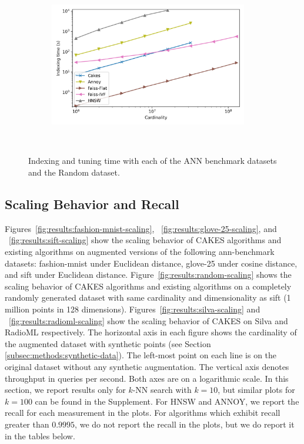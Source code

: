 \begin{figure}
\begin{subfigure}[b]{0.47\textwidth}
    \label{fig:results:sift-indexing}
    \end{subfigure}%
    \begin{subfigure}[b]{0.47\textwidth}
    \includegraphics[width=0.95\textwidth]{plots/random-indexing.png}\\
    \label{fig:results:random-indexing}
    \end{subfigure}%
    \\
    \vspace{1em}
    \caption{Indexing and tuning time with each of the ANN benchmark datasets and the Random dataset.}
    \label{fig:results:indexing}
\end{figure}


\subsection{Scaling Behavior and Recall}
\label{subsec:scaling-behavior-results}

Figures~\ref{fig:results:fashion-mnist-scaling}, ~\ref{fig:results:glove-25-scaling}, and ~\ref{fig:results:sift-scaling} show the scaling behavior of CAKES algorithms and existing algorithms on augmented versions of the following ann-benchmark datasets: fashion-mnist under Euclidean distance, glove-25 under cosine distance, and sift under Euclidean distance.
Figure~\ref{fig:results:random-scaling} shows the scaling behavior of CAKES algorithms and existing algorithms on a completely randomly generated dataset with same cardinality and dimensionality as sift (1 million points in 128 dimensions).
Figures~\ref{fig:results:silva-scaling} and ~\ref{fig:results:radioml-scaling} show the scaling behavior of CAKES on Silva and RadioML respectively.
The horizontal axis in each figure shows the cardinality of the augmented dataset with synthetic points (see Section \ref{subsec:methods:synthetic-data}).
The left-most point on each line is on the original dataset without any synthetic augmentation.
The vertical axis denotes throughput in queries per second.
Both axes are on a logarithmic scale.
In this section, we report results only for $k$-NN search with $k = 10$, but similar plots for $k=100$ can be found in the Supplement.
For HNSW and ANNOY, we report the recall for each measurement in the plots. For algorithms which exhibit recall greater than $0.9995$, we do not report the recall in the plots, but we do report it in the tables below.


